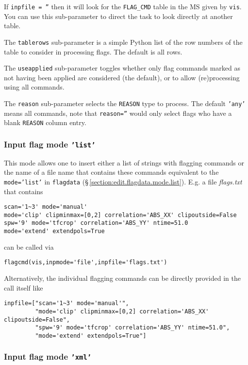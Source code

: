 If {\tt inpfile = ''} then it will look for the {\tt FLAG\_CMD} 
table in the MS given by {\tt vis}. You can use this sub-parameter to
direct the task to look directly at another table.

The {\tt tablerows} sub-parameter is a simple Python list of the row
numbers of the table to consider in processing flags.  The default is
all rows.

The {\tt useapplied} sub-parameter toggles whether only flag commands
marked as not having been applied are considered (the default), or
to allow (re)processing using all commands.

The {\tt reason} sub-parameter selects the {\tt REASON} type to
process.  The default {\tt 'any'} means all commands, note that
{\tt reason=''} would only select flags who have a blank {\tt REASON}
column entry.



\subsubsection{Input flag mode {\tt 'list'}}
\label{section:edit.flagcmd.inpmode.list}
This mode allows one to insert either a list of strings with flagging
commands or the name of a file name that contains these commands
equivalent to the {\tt mode='list'} in {\tt flagdata}
(\S\,\ref{section:edit.flagdata.mode.list}). E.g. a file {\it
  flags.txt} that contains 
\small
\begin{verbatim}
scan='1~3' mode='manual'
mode='clip' clipminmax=[0,2] correlation='ABS_XX' clipoutside=False
spw='9' mode='tfcrop' correlation='ABS_YY' ntime=51.0
mode='extend' extendpols=True
\end{verbatim}
\normalsize
can be called via  
\small
\begin{verbatim}
flagcmd(vis,inpmode='file',inpfile='flags.txt')
\end{verbatim}
\normalsize

Alternatively, the individual flagging commands can
be directly provided in the call itself like 
\small
\begin{verbatim}
inpfile=["scan='1~3' mode='manual'", 
         "mode='clip' clipminmax=[0,2] correlation='ABS_XX' clipoutside=False",
         "spw='9' mode='tfcrop' correlation='ABS_YY' ntime=51.0",
         "mode='extend' extendpols=True"]
\end{verbatim}
\normalsize



\subsubsection{Input flag mode {\tt 'xml'}}
\label{section:edit.flagcmd.inpmode.xml}


